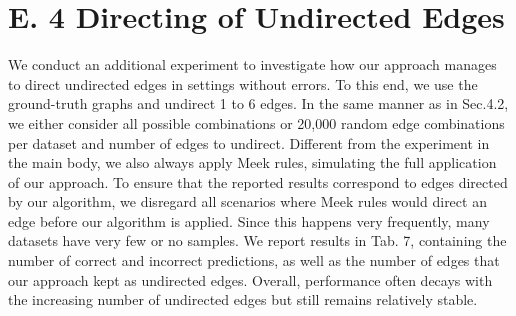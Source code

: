 \documentclass[10pt]{article}
\begin{document}
\section*{E. 4 Directing of Undirected Edges}
We conduct an additional experiment to investigate how our approach manages to direct undirected edges in settings without errors. To this end, we use the ground-truth graphs and undirect 1 to 6 edges. In the same manner as in Sec.4.2, we either consider all possible combinations or 20,000 random edge combinations per dataset and number of edges to undirect. Different from the experiment in the main body, we also always apply Meek rules, simulating the full application of our approach. To ensure that the reported results correspond to edges directed by our algorithm, we disregard all scenarios where Meek rules would direct an edge before our algorithm is applied. Since this happens very frequently, many datasets have very few or no samples. We report results in Tab. 7, containing the number of correct and incorrect predictions, as well as the number of edges that our approach kept as undirected edges. Overall, performance often decays with the increasing number of undirected edges but still remains relatively stable.
\end{document}
